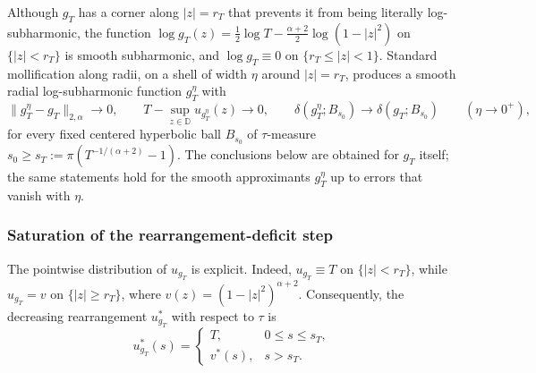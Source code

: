 \documentclass[a4paper,10pt]{amsart}
\newcommand{\D}{\mathbb{D}}
\begin{document}
Although $g_T$ has a corner along $|z|=r_T$ that prevents it from being
literally log-subharmonic, the function
$\log g_T(z)=\tfrac12\log T-\tfrac{\alpha+2}{2}\log(1-|z|^2)$ on
$\{|z|<r_T\}$ is smooth subharmonic, and $\log g_T\equiv 0$ on
$\{r_T\le|z|<1\}$. Standard mollification along radii, on a shell of width $\eta$
around $|z|=r_T$, produces a smooth radial log-subharmonic function
$g_T^\eta$ with
\[
\|g_T^\eta-g_T\|_{2,\alpha}\to 0,\qquad
T-\sup_{z\in\D}u_{g_T^\eta}(z)\to 0,\qquad
\delta(g_T^\eta;B_{s_0})\to\delta(g_T;B_{s_0})\qquad (\eta\to0^+),
\]
for every fixed centered hyperbolic ball $B_{s_0}$ of $\tau$-measure
$s_0\ge s_T:=\pi(T^{-1/(\alpha+2)}-1)$. The conclusions below are obtained for
$g_T$ itself; the same statements hold for the smooth approximants $g_T^\eta$ up
to errors that vanish with $\eta$.

\subsubsection*{Saturation of the rearrangement-deficit step}

The pointwise distribution of $u_{g_T}$ is explicit. Indeed, $u_{g_T}\equiv T$
on $\{|z|<r_T\}$, while $u_{g_T}=v$ on $\{|z|\ge r_T\}$, where
$v(z)=(1-|z|^2)^{\alpha+2}$. Consequently, the decreasing rearrangement
$u_{g_T}^*$ with respect to $\tau$ is
\[
u_{g_T}^*(s)
=
\begin{cases}T,& 0\le s\le s_T,\\ v^*(s),& s>s_T.\end{cases}
\]
\end{document}
